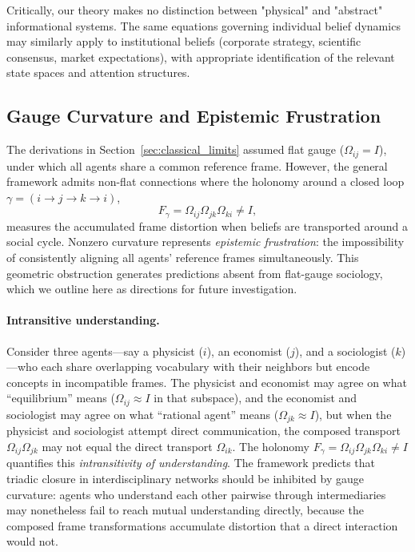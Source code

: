 \documentclass[12pt]{article}
\begin{document}
Critically, our theory makes no distinction between "physical" and "abstract" informational systems. The same equations governing individual belief dynamics may similarly apply to institutional beliefs (corporate strategy, scientific consensus, market expectations), with appropriate identification of the relevant state spaces and attention structures.

\subsection{Gauge Curvature and Epistemic Frustration}
\label{sec:curvature_predictions}

The derivations in Section~\ref{sec:classical_limits} assumed flat gauge ($\Omega_{ij} = I$), under which all agents share a common reference frame. However, the general framework admits non-flat connections where the holonomy around a closed loop $\gamma = (i \to j \to k \to i)$,
\begin{equation}
F_\gamma = \Omega_{ij}\Omega_{jk}\Omega_{ki} \neq I,
\end{equation}
measures the accumulated frame distortion when beliefs are transported around a social cycle. Nonzero curvature represents \emph{epistemic frustration}: the impossibility of consistently aligning all agents' reference frames simultaneously. This geometric obstruction generates predictions absent from flat-gauge sociology, which we outline here as directions for future investigation.

\paragraph{Intransitive understanding.} Consider three agents---say a physicist ($i$), an economist ($j$), and a sociologist ($k$)---who each share overlapping vocabulary with their neighbors but encode concepts in incompatible frames. The physicist and economist may agree on what ``equilibrium'' means ($\Omega_{ij} \approx I$ in that subspace), and the economist and sociologist may agree on what ``rational agent'' means ($\Omega_{jk} \approx I$), but when the physicist and sociologist attempt direct communication, the composed transport $\Omega_{ij}\Omega_{jk}$ may not equal the direct transport $\Omega_{ik}$. The holonomy $F_\gamma = \Omega_{ij}\Omega_{jk}\Omega_{ki} \neq I$ quantifies this \emph{intransitivity of understanding}. The framework predicts that triadic closure in interdisciplinary networks should be inhibited by gauge curvature: agents who understand each other pairwise through intermediaries may nonetheless fail to reach mutual understanding directly, because the composed frame transformations accumulate distortion that a direct interaction would not.
\end{document}
